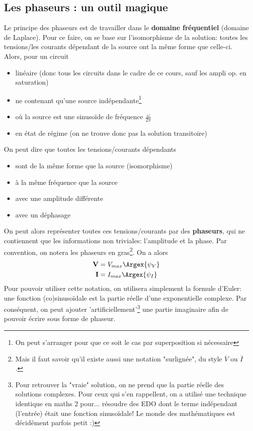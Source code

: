 \subsection{Les phaseurs : un outil magique}
Le principe des phaseurs est de travailler dans le \textbf{domaine fréquentiel} (domaine de Laplace). Pour ce faire, on se base sur l'isomorphisme de la solution: toutes les tensions/les courants dépendant de la source ont la même forme que celle-ci.
Alors, pour un circuit \begin{itemize}
\item linéaire (donc tous les circuits dans le cadre de ce cours, sauf les ampli op. en saturation)
\item ne contenant qu'une source indépendante\footnote{On peut s'arranger pour que ce soit le cas par superposition si nécessaire}
\item où la source est une sinusoïde de fréquence $\frac{\omega}{2\pi}$
\item en état de régime (on ne trouve donc pas la solution transitoire)
\end{itemize}
On peut dire que toutes les tensions/courants dépendants \begin{itemize}
\item sont de la même forme que la source (isomorphisme)
\item à la même fréquence que la source
\item avec une amplitude différente
\item avec un déphasage
\end{itemize}
On peut alors représenter toutes ces tensions/courants par des \textbf{phaseurs}, qui ne contiennent que les informations non triviales: l'amplitude et la phase. Par convention, on notera les phaseurs en gras\footnote{Mais il faut savoir qu'il existe aussi une notation "surlignée", du style $\overline{V}$ ou $\overline{I}$.}. On a alors
\begin{align*}
\textbf{V} &= V_{max}\Argex{{\psi_V}}\\
\textbf{I} &= I_{max}\Argex{{\psi_I}}
\end{align*}
Pour pouvoir utiliser cette notation, on utilisera simplement la formule d'Euler: une fonction (co)sinusoïdale est la partie réelle d'une exponentielle complexe. Par conséquent, on peut ajouter 'artificiellement'\footnote{Pour retrouver la "vraie" solution, on ne prend que la partie réelle des solutions complexes. Pour ceux qui s'en rappellent, on a utilisé une technique identique en maths 2 pour... résoudre des EDO dont le terme indépendant (l'entrée) était une fonction sinusoïdale! Le monde des mathématiques est décidément parfois petit :)} une partie imaginaire afin de pouvoir écrire sous forme de phaseur.
